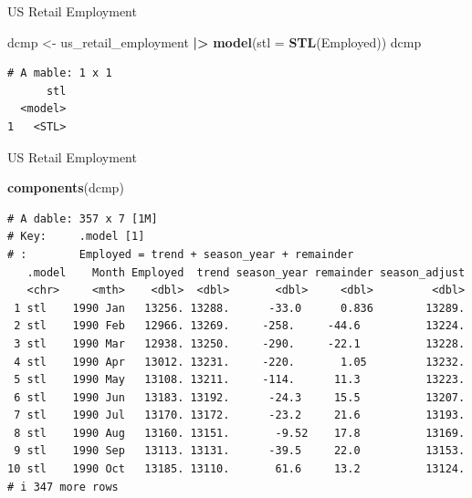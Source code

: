 \documentclass[
  14pt,
  ignorenonframetext,
  aspectratio=169,
]{beamer}
\newenvironment{Shaded}{\begin{snugshade}}{\end{snugshade}}
\newcommand{\AttributeTok}[1]{\textcolor[rgb]{0.13,0.29,0.53}{#1}}
\newcommand{\FunctionTok}[1]{\textcolor[rgb]{0.13,0.29,0.53}{\textbf{#1}}}
\newcommand{\NormalTok}[1]{#1}
\newcommand{\OtherTok}[1]{\textcolor[rgb]{0.56,0.35,0.01}{#1}}
\newcommand{\SpecialCharTok}[1]{\textcolor[rgb]{0.81,0.36,0.00}{\textbf{#1}}}
\renewenvironment{Shaded}{\vspace*{0.15cm}\color{black}\fontsize{10}{10}\sf\begin{snugshade}\color{black}}{\end{snugshade}}
\begin{document}
\begin{frame}[fragile]{US Retail Employment}
\protect{}\label{us-retail-employment-2}
\fontsize{11}{11}\sf

\begin{Shaded}
\begin{Highlighting}[]
\NormalTok{dcmp }\OtherTok{\textless{}{-}}\NormalTok{ us\_retail\_employment }\SpecialCharTok{|\textgreater{}}
  \FunctionTok{model}\NormalTok{(}\AttributeTok{stl =} \FunctionTok{STL}\NormalTok{(Employed))}
\NormalTok{dcmp}
\end{Highlighting}
\end{Shaded}

\begin{verbatim}
# A mable: 1 x 1
      stl
  <model>
1   <STL>
\end{verbatim}

\vspace*{10cm}
\end{frame}

\begin{frame}[fragile]{US Retail Employment}
\protect{}\label{us-retail-employment-3}
\fontsize{11}{11}\sf

\begin{Shaded}
\begin{Highlighting}[]
\FunctionTok{components}\NormalTok{(dcmp)}
\end{Highlighting}
\end{Shaded}

\begin{verbatim}
# A dable: 357 x 7 [1M]
# Key:     .model [1]
# :        Employed = trend + season_year + remainder
   .model    Month Employed  trend season_year remainder season_adjust
   <chr>     <mth>    <dbl>  <dbl>       <dbl>     <dbl>         <dbl>
 1 stl    1990 Jan   13256. 13288.      -33.0      0.836        13289.
 2 stl    1990 Feb   12966. 13269.     -258.     -44.6          13224.
 3 stl    1990 Mar   12938. 13250.     -290.     -22.1          13228.
 4 stl    1990 Apr   13012. 13231.     -220.       1.05         13232.
 5 stl    1990 May   13108. 13211.     -114.      11.3          13223.
 6 stl    1990 Jun   13183. 13192.      -24.3     15.5          13207.
 7 stl    1990 Jul   13170. 13172.      -23.2     21.6          13193.
 8 stl    1990 Aug   13160. 13151.       -9.52    17.8          13169.
 9 stl    1990 Sep   13113. 13131.      -39.5     22.0          13153.
10 stl    1990 Oct   13185. 13110.       61.6     13.2          13124.
# i 347 more rows
\end{verbatim}

\vspace*{10cm}
\end{frame}
\end{document}

